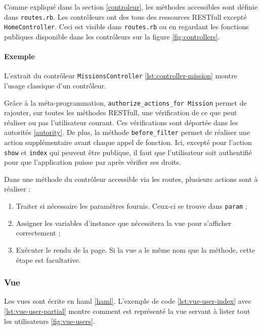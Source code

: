 Comme expliqué dans la section \ref{controleur}, les méthodes accessibles sont définie dans \texttt{routes.rb}. Les contrôleurs ont des tous des ressources RESTfull excepté \texttt{HomeController}. Ceci est visible dans \texttt{routes.rb} ou en regardant les fonctions publiques disponible dans les contrôleurs sur la figure \ref{fig:controllers}.

\paragraph{Exemple}
L'extrait du contrôleur \texttt{MissionsController} \ref{lst:controller-mission} montre l'usage classique d'un contrôleur. 


Grâce à la méta-programmation, \lstinline[language=Rails]{authorize_actions_for Mission} permet de rajouter, sur toutes les méthodes RESTfull, une vérification de ce que peut réaliser ou pas l'utilisateur courant. Ces vérifications sont déportée dans les autorités \ref{autority}. De plus, la méthode \lstinline[language=Rails]{before_filter} permet de réaliser une action supplémentaire avant chaque appel de fonction. Ici, excepté pour l'action \texttt{show} et \texttt{index} qui peuvent être publique, il faut que l'utilisateur soit authentifié pour que l'application puisse par après vérifier ses droits. %

Dans une méthode du contrôleur accessible via les routes, plusieurs actions sont à réaliser :
\begin{enumerate}
  \item Traiter si nécessaire les paramètres fournis. Ceux-ci se trouve dans \lstinline[language=Rails]{param} ;
  \item Assigner les variables d'instance que nécessitera la vue pour s'afficher correctement ;
  \item Exécuter le rendu de la page. Si la vue a le même nom que la méthode, cette étape est facultative.
\end{enumerate}

\subsubsection{Vue}
\label{vues}
Les vues sont écrite en haml \ref{haml}. L'exemple de code \ref{lst:vue-user-index} avec \ref{lst:vue-user-partial} montre comment est représenté la vue servant à lister tout les utilisateurs \ref{fig:vue-users}.

